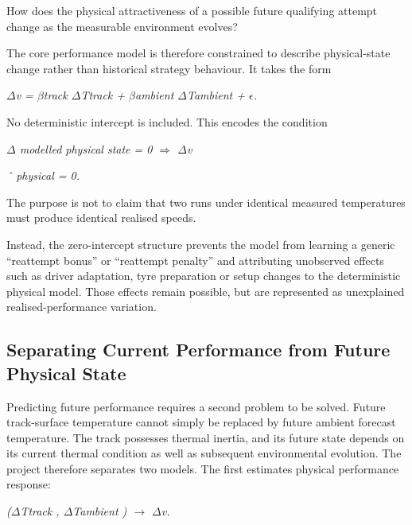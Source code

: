 How does the physical attractiveness of a possible future qualifying attempt change as the measurable environment evolves?

The core performance model is therefore constrained to describe physical-state change rather than historical strategy behaviour. It takes the form

\begin{center}\textit{\ensuremath{\Delta}v = \ensuremath{\beta}track \ensuremath{\Delta}Ttrack + \ensuremath{\beta}ambient \ensuremath{\Delta}Tambient + \ensuremath{\epsilon}.}\end{center}

No deterministic intercept is included. This encodes the condition

\begin{center}\textit{\ensuremath{\Delta} modelled physical state = 0    \ensuremath{\Rightarrow}     \ensuremath{\Delta}v}\end{center}

\begin{center}\textit{ˆ physical = 0.}\end{center}

The purpose is not to claim that two runs under identical measured temperatures must produce identical realised speeds.

Instead, the zero-intercept structure prevents the model from learning a generic ``reattempt bonus'' or ``reattempt penalty'' and attributing unobserved effects such as driver adaptation, tyre preparation or setup changes to the deterministic physical model. Those effects remain possible, but are represented as unexplained realised-performance variation.

\subsection{Separating Current Performance from Future Physical State}
Predicting future performance requires a second problem to be solved. Future track-surface temperature cannot simply be replaced by future ambient forecast temperature. The track possesses thermal inertia, and its future state depends on its current thermal condition as well as subsequent environmental evolution. The project therefore separates two models. The first estimates physical performance response:

\begin{center}\textit{(\ensuremath{\Delta}Ttrack , \ensuremath{\Delta}Tambient ) \ensuremath{\rightarrow} \ensuremath{\Delta}v.}\end{center}

